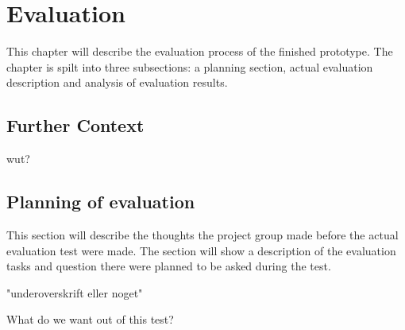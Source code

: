 \chapter{Evaluation}\label{ch:evaluation}
This chapter will describe the evaluation process of the finished prototype. The chapter is spilt into three subsections: a planning section, actual evaluation description and analysis of evaluation results. 

\section{Further Context}\label{sec:furthercontext}
 wut?

\section{Planning of evaluation}
This section will describe the thoughts the project group made before the actual evaluation test were made. The section will show a description of the evaluation tasks and question there were planned to be asked during the test. 

"underoverskrift eller noget" 

What do we want out of this test?

